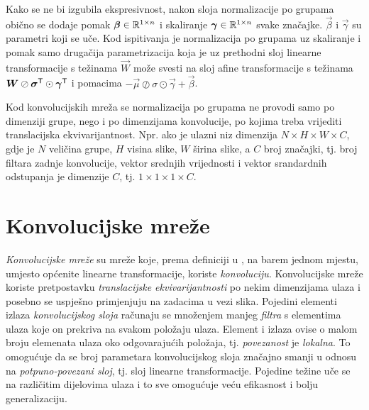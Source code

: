 \documentclass[utf8, diplomski, lmodern]{fer}
\begin{document}
Kako se ne bi izgubila ekspresivnost, nakon sloja normalizacije po grupama obično se dodaje pomak $\vec\beta\in\R^{1\times n}$ i skaliranje $\vec\gamma\in\R^{1\times n}$ svake značajke. $\vec\beta$ i $\vec\gamma$ su parametri koji se uče. Kod ispitivanja je normalizacija po grupama uz skaliranje i pomak samo drugačija parametrizacija koja je uz prethodni sloj linearne transformacije s težinama $\vec W$ može svesti na sloj afine transformacije s težinama $\vec W\oslash\vec\sigma^\tp\odot\vec\gamma^\tp$ i pomacima $-\vec\mu\oslash\sigma\odot\vec\gamma+\vec\beta$.

Kod konvolucijskih mreža se normalizacija po grupama ne provodi samo po dimenziji grupe, nego i po dimenzijama konvolucije, po kojima treba vrijediti translacijska ekvivarijantnost. Npr. ako je ulazni niz dimenzija $N\times H\times W\times C$, gdje je $N$ veličina grupe, $H$ visina slike, $W$ širina slike, a $C$ broj značajki, tj. broj filtara zadnje konvolucije, vektor srednjih vrijednosti i vektor srandardnih odstupanja je dimenzije $C$, tj. $1\times 1\times 1\times C$.



\section{Konvolucijske mreže}

\emph{Konvolucijske mreže} su mreže koje, prema definiciji u \citet{Goodfellow:2016:DL}, na barem jednom mjestu, umjesto općenite linearne transformacije, koriste \emph{konvoluciju}. Konvolucijske mreže koriste pretpostavku \emph{translacijske ekvivarijantnosti} po nekim dimenzijama ulaza i posebno se uspješno primjenjuju na zadacima u vezi slika. Pojedini elementi izlaza \emph{konvolucijskog sloja} računaju se množenjem manjeg \emph{filtra} s elementima ulaza koje on prekriva na svakom položaju ulaza. Element i izlaza ovise o malom broju elemenata ulaza oko odgovarajućih položaja, tj. \emph{povezanost} je \emph{lokalna}. To omogućuje da se broj parametara konvolucijskog sloja značajno smanji u odnosu na \emph{potpuno-povezani sloj}, tj. sloj linearne transformacije. Pojedine težine uče se na različitim dijelovima ulaza i to sve omogućuje veću efikasnost i bolju generalizaciju.
\end{document}
